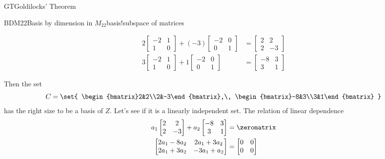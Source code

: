 \begin{subsect}{GT}{Goldilocks' Theorem}
\begin{example}{BDM22}{Basis by dimension in $M_{22}$}{basis!subspace of matrices}
\begin{para}
%
\begin{align*}
    2\begin{bmatrix}-2&1\\1&0\end{bmatrix}+
 (-3)\begin{bmatrix}-2&0\\0&1\end{bmatrix}&=
 \begin{bmatrix}2&2\\2&-3\end{bmatrix}\\
3\begin{bmatrix}-2&1\\1&0\end{bmatrix}+
 1\begin{bmatrix}-2&0\\0&1\end{bmatrix}&=
\begin{bmatrix}-8&3\\3&1\end{bmatrix}
\end{align*}
\end{para}
%
\begin{para}Then the set
%
\begin{equation*}
C=
\set{
\begin{bmatrix}2&2\\2&-3\end{bmatrix},\,
\begin{bmatrix}-8&3\\3&1\end{bmatrix}
}
\end{equation*}
%
has the right size to be a basis of $Z$.  Let's see if it is a linearly independent set.  The relation of linear dependence
%
\begin{align*}
a_1\begin{bmatrix}2&2\\2&-3\end{bmatrix}+
a_2\begin{bmatrix}-8&3\\3&1\end{bmatrix}&=\zeromatrix\\
\begin{bmatrix}2a_1-8a_2&2a_1+3a_2\\2a_1+3a_2&-3a_1+a_2\end{bmatrix}&=
\begin{bmatrix}0&0\\0&0\end{bmatrix}
\end{align*}

\end{para}
\end{example}
\end{subsect}

